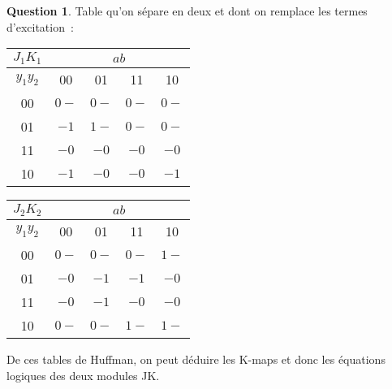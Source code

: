 \documentclass[11pt,a4paper]{article}
\theoremstyle{definition}%
\newtheorem{Q}{Question}[] %
\begin{document}
\begin{Q}
{	Table qu'on sépare en deux et dont on remplace les termes d'excitation~:
	\begin{center}
		\begin{tabular}{|c|c|c|c|c|}\hline
		$J_1K_1$ & \multicolumn{4}{c|}{$ab$} \\ \hline
		$y_1y_2$ & 00 & 01 & 11 & 10 \\ \hline
		00 & $0-$ & $0-$ & $0-$ & $0-$ \\ \hline
		01 & $-1$ & $1-$ & $0-$ & $0-$ \\ \hline
		11 & $-0$ & $-0$ & $-0$ & $-0$ \\ \hline
		10 & $-1$ & $-0$ & $-0$ & $-1$ \\ \hline
		\end{tabular}
	\end{center}

	\begin{center}
		\begin{tabular}{|c|c|c|c|c|}\hline
		$J_2K_2$ & \multicolumn{4}{c|}{$ab$} \\ \hline
		$y_1y_2$ & 00 & 01 & 11 & 10 \\ \hline
		00 & $0-$ & $0-$ & $0-$ & $1-$ \\ \hline
		01 & $-0$ & $-1$ & $-1$ & $-0$ \\ \hline
		11 & $-0$ & $-1$ & $-0$ & $-0$ \\ \hline
		10 & $0-$ & $0-$ & $1-$ & $1-$ \\ \hline
		\end{tabular}
	\end{center}

	De ces tables de Huffman, on peut déduire les K-maps et donc les équations logiques des deux modules JK.

	\begin{center}
	\end{center}
	\begin{center}
	\end{center}
	\begin{center}
	\end{center}
	\begin{center}
	\end{center}


}


\end{Q}
\end{document}
